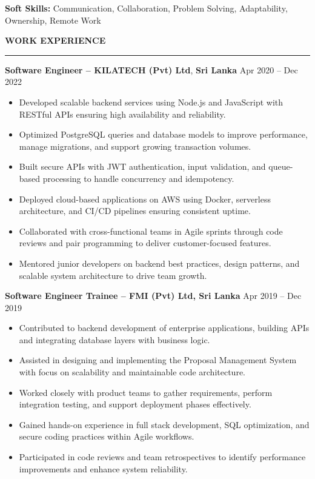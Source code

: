 \documentclass[10pt,letterpaper]{article}
\begin{document}
\textbf{Soft Skills:} Communication, Collaboration, Problem Solving, Adaptability, Ownership, Remote Work

\vspace{8pt}

\textbf{WORK EXPERIENCE}\\[-8pt]
\noindent\rule{\textwidth}{1pt}

\vspace{-2pt}

\textbf{Software Engineer -- KILATECH (Pvt) Ltd}, \textbf{Sri Lanka} \hfill Apr 2020 -- Dec 2022

\vspace{-1pt}

\begin{itemize}
\item Developed scalable backend services using Node.js and JavaScript with RESTful APIs ensuring high availability and reliability.
\item Optimized PostgreSQL queries and database models to improve performance, manage migrations, and support growing transaction volumes.
\item Built secure APIs with JWT authentication, input validation, and queue-based processing to handle concurrency and idempotency.
\item Deployed cloud-based applications on AWS using Docker, serverless architecture, and CI/CD pipelines ensuring consistent uptime.
\item Collaborated with cross-functional teams in Agile sprints through code reviews and pair programming to deliver customer-focused features.
\item Mentored junior developers on backend best practices, design patterns, and scalable system architecture to drive team growth.
\end{itemize}

\textbf{Software Engineer Trainee -- FMI (Pvt) Ltd, Sri Lanka} \hfill Apr 2019 -- Dec 2019

\vspace{-1pt}

\begin{itemize}
\item Contributed to backend development of enterprise applications, building APIs and integrating database layers with business logic.
\item Assisted in designing and implementing the Proposal Management System with focus on scalability and maintainable code architecture.
\item Worked closely with product teams to gather requirements, perform integration testing, and support deployment phases effectively.
\item Gained hands-on experience in full stack development, SQL optimization, and secure coding practices within Agile workflows.
\item Participated in code reviews and team retrospectives to identify performance improvements and enhance system reliability.
\end{itemize}
\end{document}
